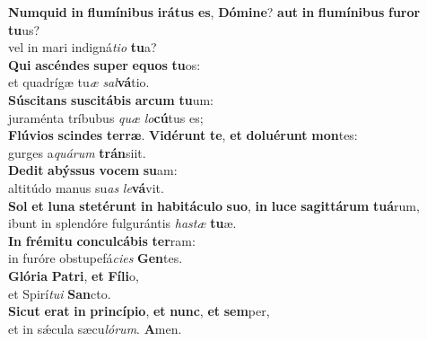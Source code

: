 \evenverse \textbf{Num}\textbf{quid} \textbf{in} \textbf{flu}\textbf{mí}\textbf{ni}\textbf{bus} \textbf{i}\textbf{rá}\textbf{tus} \textbf{es}, \textbf{Dó}\textbf{mi}\textbf{ne}? \textbf{aut} \textbf{in} \textbf{flu}\textbf{mí}\textbf{ni}\textbf{bus} \textbf{fu}\textbf{ror} \textbf{tu}us?~\*\\
\evenverse vel in mari indigná\textit{ti}\textit{o} \textbf{tu}a?\\
\oddverse \textbf{Qui} \textbf{a}\textbf{scén}\textbf{des} \textbf{su}\textbf{per} \textbf{e}\textbf{quos} \textbf{tu}os:~\*\\
\oddverse et quadrígæ tu\textit{æ} \textit{sal}\textbf{vá}tio.\\
\evenverse \textbf{Sú}\textbf{sci}\textbf{tans} \textbf{su}\textbf{sci}\textbf{tá}\textbf{bis} \textbf{ar}\textbf{cum} \textbf{tu}um:~\*\\
\evenverse juraménta tríbubus \textit{quæ} \textit{lo}\textbf{cú}tus es;\\
\oddverse \textbf{Flú}\textbf{vi}\textbf{os} \textbf{scin}\textbf{des} \textbf{ter}\textbf{ræ}. \textbf{Vi}\textbf{dé}\textbf{runt} \textbf{te}, \textbf{et} \textbf{do}\textbf{lu}\textbf{é}\textbf{runt} \textbf{mon}tes:~\*\\
\oddverse gurges a\textit{quá}\textit{rum} \textbf{trán}siit.\\
\evenverse \textbf{De}\textbf{dit} \textbf{a}\textbf{býs}\textbf{sus} \textbf{vo}\textbf{cem} \textbf{su}am:~\*\\
\evenverse altitúdo manus su\textit{as} \textit{le}\textbf{vá}vit.\\
\oddverse \textbf{Sol} \textbf{et} \textbf{lu}\textbf{na} \textbf{ste}\textbf{té}\textbf{runt} \textbf{in} \textbf{ha}\textbf{bi}\textbf{tá}\textbf{cu}\textbf{lo} \textbf{su}\textbf{o}, \textbf{in} \textbf{lu}\textbf{ce} \textbf{sa}\textbf{git}\textbf{tá}\textbf{rum} \textbf{tu}\textbf{á}rum,~\*\\
\oddverse ibunt in splendóre fulgurántis \textit{ha}\textit{stæ} \textbf{tu}æ.\\
\evenverse \textbf{In} \textbf{fré}\textbf{mi}\textbf{tu} \textbf{con}\textbf{cul}\textbf{cá}\textbf{bis} \textbf{ter}ram:~\*\\
\evenverse in furóre obstupefá\textit{ci}\textit{es} \textbf{Gen}tes.\\
\oddverse \textbf{Gló}\textbf{ri}\textbf{a} \textbf{Pa}\textbf{tri}, \textbf{et} \textbf{Fí}\textbf{li}o,~\*\\
\oddverse et Spirí\textit{tu}\textit{i} \textbf{San}cto.\\
\evenverse \textbf{Si}\textbf{cut} \textbf{e}\textbf{rat} \textbf{in} \textbf{prin}\textbf{cí}\textbf{pi}\textbf{o}, \textbf{et} \textbf{nunc}, \textbf{et} \textbf{sem}per,~\*\\
\evenverse et in sǽcula sæcu\textit{ló}\textit{rum}. \textbf{A}men.\\
